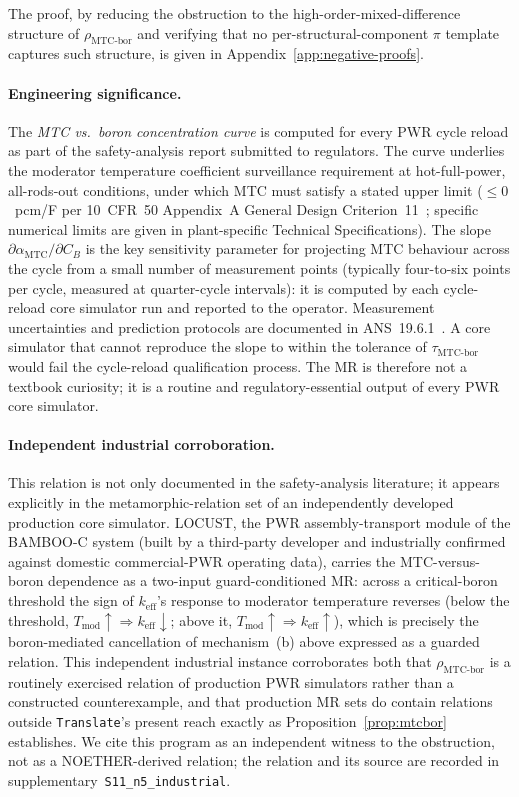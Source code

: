 \documentclass[acmsmall,screen,review]{acmart}
\begin{document}
The proof, by reducing the obstruction to the high-order-mixed-difference structure of $\rho_{\mathrm{MTC\text{-}bor}}$ and verifying that no per-structural-component $\pi$ template captures such structure, is given in Appendix~\ref{app:negative-proofs}.

\paragraph{Engineering significance.}
The \emph{MTC vs.\ boron concentration curve} is computed for every PWR cycle reload as part of the safety-analysis report submitted to regulators. The curve underlies the moderator temperature coefficient surveillance requirement at hot-full-power, all-rods-out conditions, under which MTC must satisfy a stated upper limit ($\le 0$~pcm/\textdegree{}F per 10~CFR~50 Appendix~A General Design Criterion~11~\cite{NRC10CFR50AppA}; specific numerical limits are given in plant-specific Technical Specifications). The slope $\partial \alpha_{\mathrm{MTC}}/\partial C_{B}$ is the key sensitivity parameter for projecting MTC behaviour across the cycle from a small number of measurement points (typically four-to-six points per cycle, measured at quarter-cycle intervals): it is computed by each cycle-reload core simulator run and reported to the operator. Measurement uncertainties and prediction protocols are documented in ANS~19.6.1~\cite{ANS196_1}. A core simulator that cannot reproduce the slope to within the tolerance of $\tau_{\mathrm{MTC\text{-}bor}}$ would fail the cycle-reload qualification process. The MR is therefore not a textbook curiosity; it is a routine and regulatory-essential output of every PWR core simulator.

\paragraph{Independent industrial corroboration.}
This relation is not only documented in the safety-analysis literature; it appears explicitly in the metamorphic-relation set of an independently developed production core simulator. LOCUST, the PWR assembly-transport module of the BAMBOO-C system (built by a third-party developer and industrially confirmed against domestic commercial-PWR operating data), carries the MTC-versus-boron dependence as a two-input guard-conditioned MR: across a critical-boron threshold the sign of $k_{\mathrm{eff}}$'s response to moderator temperature reverses (below the threshold, $T_{\mathrm{mod}} \uparrow \Rightarrow k_{\mathrm{eff}} \downarrow$; above it, $T_{\mathrm{mod}} \uparrow \Rightarrow k_{\mathrm{eff}} \uparrow$), which is precisely the boron-mediated cancellation of mechanism~(b) above expressed as a guarded relation. This independent industrial instance corroborates both that $\rho_{\mathrm{MTC\text{-}bor}}$ is a routinely exercised relation of production PWR simulators rather than a constructed counterexample, and that production MR sets do contain relations outside \texttt{Translate}'s present reach exactly as Proposition~\ref{prop:mtcbor} establishes. We cite this program as an independent witness to the obstruction, not as a NOETHER-derived relation; the relation and its source are recorded in supplementary~\texttt{S11\_n5\_industrial}.
\end{document}
